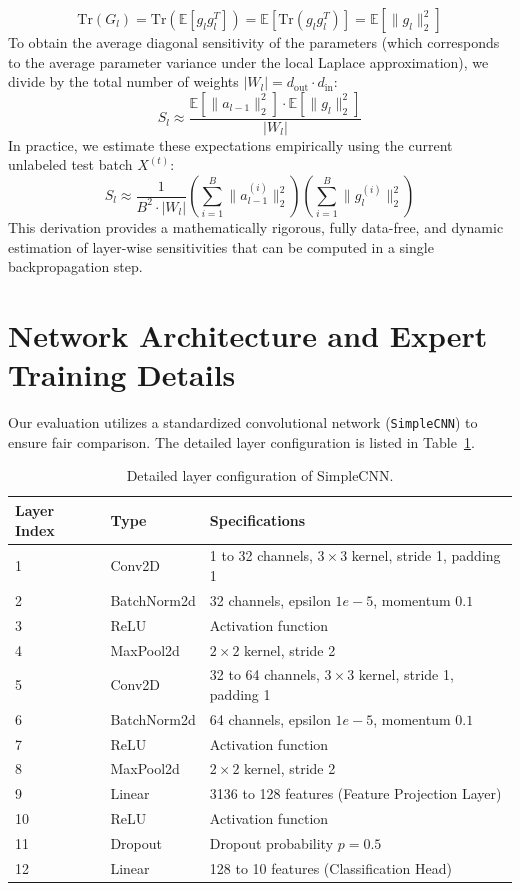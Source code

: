 \documentclass{article}
\theoremstyle{plain}
\theoremstyle{definition}
\theoremstyle{remark}
\begin{document}
\begin{equation}
\text{Tr}(G_l) = \text{Tr}(\mathbb{E}[g_l g_l^T]) = \mathbb{E}[\text{Tr}(g_l g_l^T)] = \mathbb{E}[\|g_l\|_2^2]
\end{equation}
To obtain the average diagonal sensitivity of the parameters (which corresponds to the average parameter variance under the local Laplace approximation), we divide by the total number of weights $|W_l| = d_{\text{out}} \cdot d_{\text{in}}$:
\begin{equation}
S_l \approx \frac{\mathbb{E}[\|a_{l-1}\|_2^2] \cdot \mathbb{E}[\|g_l\|_2^2]}{|W_l|}
\end{equation}
In practice, we estimate these expectations empirically using the current unlabeled test batch $X^{(t)}$:
\begin{equation}
S_l \approx \frac{1}{B^2 \cdot |W_l|} \left( \sum_{i=1}^B \|a_{l-1}^{(i)}\|_2^2 \right) \left( \sum_{i=1}^B \|g_l^{(i)}\|_2^2 \right)
\end{equation}
This derivation provides a mathematically rigorous, fully data-free, and dynamic estimation of layer-wise sensitivities that can be computed in a single backpropagation step.

\section{Network Architecture and Expert Training Details}
\label{appendix:architecture}
Our evaluation utilizes a standardized convolutional network (\texttt{SimpleCNN}) to ensure fair comparison. The detailed layer configuration is listed in Table~\ref{tab:simplecnn}.

\begin{table}[h]
\centering
\caption{Detailed layer configuration of SimpleCNN.}
\label{tab:simplecnn}
\vskip 0.15in
\begin{tabular}{lll}
\toprule
Layer Index & Type & Specifications \\
\midrule
1 & Conv2D & 1 to 32 channels, $3 \times 3$ kernel, stride 1, padding 1 \\
2 & BatchNorm2d & 32 channels, epsilon $1e-5$, momentum $0.1$ \\
3 & ReLU & Activation function \\
4 & MaxPool2d & $2 \times 2$ kernel, stride 2 \\
5 & Conv2D & 32 to 64 channels, $3 \times 3$ kernel, stride 1, padding 1 \\
6 & BatchNorm2d & 64 channels, epsilon $1e-5$, momentum $0.1$ \\
7 & ReLU & Activation function \\
8 & MaxPool2d & $2 \times 2$ kernel, stride 2 \\
9 & Linear & 3136 to 128 features (Feature Projection Layer) \\
10 & ReLU & Activation function \\
11 & Dropout & Dropout probability $p = 0.5$ \\
12 & Linear & 128 to 10 features (Classification Head) \\
\bottomrule
\end{tabular}
\end{table}
\end{document}
